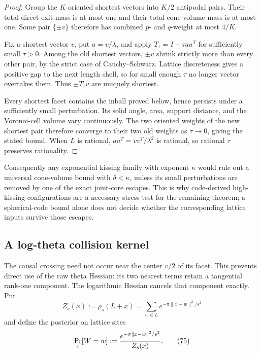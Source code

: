 \documentclass[10pt]{article}
\theoremstyle{definition}
\newcommand{\Prb}{\mathop{\rm Pr}}
\newcommand{\norm}[1]{\lVert #1\rVert}
\begin{document}
\begin{proof}
Group the $K$ oriented shortest vectors into $K/2$ antipodal pairs.  Their
total direct-exit mass is at most one and their total cone-volume mass is at
most one.  Some pair $\{\pm v\}$ therefore has combined $p$- and $q$-weight
at most $4/K$.

Fix a shortest vector $v$, put $a=v/\lambda$, and apply
$T_\tau=I-\tau aa^T$ for sufficiently small $\tau>0$.  Among the old
shortest vectors, $\pm v$ shrink strictly more than every other pair, by the
strict case of Cauchy--Schwarz.  Lattice discreteness gives a positive gap to
the next length shell, so for small enough $\tau$ no longer vector overtakes
them.  Thus $\pm T_\tau v$ are uniquely shortest.

Every shortest facet contains the inball proved below, hence persists under
a sufficiently small perturbation.  Its solid angle, area, support distance,
and the Voronoi-cell volume vary continuously.  The two oriented weights of
the new shortest pair therefore converge to their two old weights as
$\tau\to0$, giving the stated bound.  When $L$ is rational,
$aa^T=vv^T/\lambda^2$ is rational, so rational $\tau$ preserves rationality.
\end{proof}

Consequently any exponential kissing family with exponent $\kappa$ would
rule out a universal cone-volume bound with $\delta<\kappa$, unless its small
perturbations are removed by one of the exact joint-core escapes.  This is
why code-derived high-kissing configurations are a necessary stress test for
the remaining theorem; a spherical-code bound alone does not decide whether
the corresponding lattice inputs survive those escapes.

\subsection{A log-theta collision kernel}

The causal crossing need not occur near the center $v/2$ of its facet.  This
prevents direct use of the raw theta Hessian: its two nearest terms retain a
tangential rank-one component.  The logarithmic Hessian cancels that
component exactly.  Put
\[
 Z_s(x):=\rho_s(L+x)=\sum_{w\in L}e^{-\pi\norm{x-w}^2/s^2}
\]
and define the posterior on lattice sites
\[
 \Prb_x[W=w]:=\frac{e^{-\pi\norm{x-w}^2/s^2}}{Z_s(x)}.          \tag{75}
\]
\end{document}
